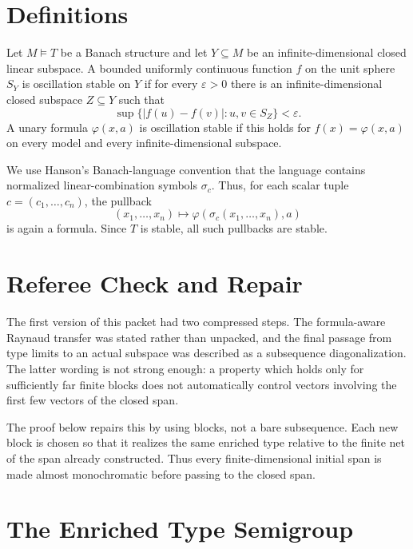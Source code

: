 \documentclass[11pt]{article}
\newcommand{\eps}{\varepsilon}
\begin{document}
\section*{Definitions}

Let \(M\models T\) be a Banach structure and let \(Y\subseteq M\) be an
infinite-dimensional closed linear subspace. A bounded uniformly continuous
function \(f\) on the unit sphere \(S_Y\) is oscillation stable on \(Y\) if for
every \(\eps>0\) there is an infinite-dimensional closed subspace
\(Z\subseteq Y\) such that
\[
  \sup\{|f(u)-f(v)|:u,v\in S_Z\}<\eps .
\]
A unary formula \(\varphi(x,a)\) is oscillation stable if this holds for
\(f(x)=\varphi(x,a)\) on every model and every infinite-dimensional subspace.

We use Hanson's Banach-language convention that the language contains
normalized linear-combination symbols \(\sigma_c\). Thus, for each scalar
tuple \(c=(c_1,\ldots,c_n)\), the pullback
\[
  (x_1,\ldots,x_n)\mapsto
  \varphi(\sigma_c(x_1,\ldots,x_n),a)
\]
is again a formula. Since \(T\) is stable, all such pullbacks are stable.

\section*{Referee Check and Repair}

The first version of this packet had two compressed steps. The
formula-aware Raynaud transfer was stated rather than unpacked, and the final
passage from type limits to an actual subspace was described as a subsequence
diagonalization. The latter wording is not strong enough: a property which
holds only for sufficiently far finite blocks does not automatically control
vectors involving the first few vectors of the closed span.

The proof below repairs this by using blocks, not a bare subsequence. Each new
block is chosen so that it realizes the same enriched type relative to the
finite net of the span already constructed. Thus every finite-dimensional
initial span is made almost monochromatic before passing to the closed span.

\section*{The Enriched Type Semigroup}
\end{document}
